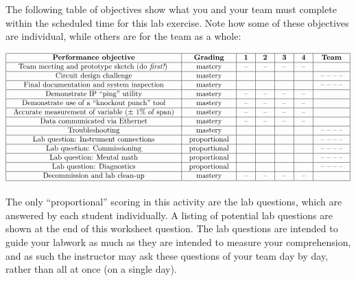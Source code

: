 \documentclass[12pt,a4paper]{article}
\begin{document}
\begin{itemize}
The following table of objectives show what you and your team must complete within the scheduled time for this lab exercise.  Note how some of these objectives are individual, while others are for the team as a whole:



$$\vbox{\offinterlineskip
\halign{\strut
\vrule \quad\hfil # \ \hfil & 
\vrule \quad\hfil # \ \hfil & 
\vrule \quad\hfil # \ \hfil & 
\vrule \quad\hfil # \ \hfil & 
\vrule \quad\hfil # \ \hfil & 
\vrule \quad\hfil # \ \hfil & 
\vrule \quad\hfil # \ \hfil \vrule \cr
\noalign{\hrule}
%
{\bf Performance objective} & {\bf Grading} & {\bf 1} & {\bf 2} & {\bf 3} & {\bf 4} & {\bf Team} \cr
%
\noalign{\hrule}
%
Team meeting and prototype sketch (do {\it first!}) & mastery & -- & -- & -- & -- & \cr
%
\noalign{\hrule}
%
Circuit design challenge & mastery & & & & & -- -- -- -- \cr
%
\noalign{\hrule}
%
Final documentation and system inspection & mastery & & & & & -- -- -- -- \cr
%
\noalign{\hrule}
%
Demonstrate IP ``ping'' utility & mastery & -- & -- & -- & -- &  \cr
%
\noalign{\hrule}
%
Demonstrate use of a ``knockout punch'' tool & mastery & -- & -- & -- & -- &  \cr
%
\noalign{\hrule}
%
Accurate measurement of variable ($\pm$ 1\% of span) & mastery & -- & -- & -- & -- &  \cr
%
\noalign{\hrule}
%
Data communicated via Ethernet & mastery & -- & -- & -- & -- &  \cr
%
\noalign{\hrule}
%
Troubleshooting & mastery & & & & & -- -- -- -- \cr
%
\noalign{\hrule}
%
Lab question: Instrument connections & proportional &  &  &  &  & -- -- -- -- \cr
%
\noalign{\hrule}
%
Lab question: Commissioning & proportional &  &  &  &  & -- -- -- -- \cr
%
\noalign{\hrule}
%
Lab question: Mental math & proportional &  &  &  &  & -- -- -- -- \cr
%
\noalign{\hrule}
%
Lab question: Diagnostics & proportional &  &  &  &  & -- -- -- -- \cr
%
\noalign{\hrule}
%
Decommission and lab clean-up & mastery & -- & -- & -- & -- &  \cr
%
\noalign{\hrule}
} %
}$$ %

The only ``proportional'' scoring in this activity are the lab questions, which are answered by each student individually.  A listing of potential lab questions are shown at the end of this worksheet question.  The lab questions are intended to guide your labwork as much as they are intended to measure your comprehension, and as such the instructor may ask these questions of your team day by day, rather than all at once (on a single day).


\end{itemize}
\end{document}
